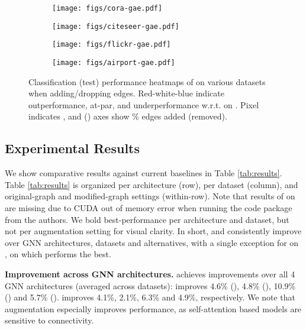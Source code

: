 \documentclass[letterpaper]{article} \usepackage{aaai21}  \usepackage{times}  \usepackage{helvet} \usepackage{courier}  \usepackage[hyphens]{url}  \usepackage{graphicx} \urlstyle{rm} \def\UrlFont{\rm}  \usepackage{natbib}  \usepackage{caption} \frenchspacing  \setlength{\pdfpagewidth}{8.5in}  \setlength{\pdfpageheight}{11in}
\begin{document}
\begin{figure}[t]
    \centering
        \begin{subfigure}[b]{.35\linewidth}
          \texttt{[image: figs/cora-gae.pdf]}
            \caption{\cora}\label{fig:}
        \end{subfigure}
        \quad
        \begin{subfigure}[b]{.35\linewidth}
          \texttt{[image: figs/citeseer-gae.pdf]}
            \caption{\citeseer}\label{fig:}
        \end{subfigure}
        \quad
        \begin{subfigure}[b]{.35\linewidth}
            \texttt{[image: figs/flickr-gae.pdf]}
            \caption{\flickr}\label{fig:}
        \end{subfigure}
        \quad
        \begin{subfigure}[b]{.35\linewidth}
            \texttt{[image: figs/airport-gae.pdf]}
            \caption{\airusa}\label{fig:}
        \end{subfigure}
    \caption{Classification (test) performance heatmaps of \methodtwo on various datasets when adding/dropping edges. Red-white-blue indicate outperformance, at-par, and underperformance w.r.t. \gcn on . Pixel  indicates , and  () axes show \% edges added (removed). }\label{fig:heat}
\end{figure}

\subsection{Experimental Results}

We show comparative results against current baselines in Table \ref{tab:results}.  Table \ref{tab:results} is organized per architecture (row), per dataset (column), and original-graph and modified-graph settings (within-row). Note that results of \bgcn on \ppi are missing due to CUDA out of memory error when running the code package from the authors. We bold best-performance per architecture and dataset, but not per augmentation setting for visual clarity.  In short, \method and \methodtwo consistently improve over GNN architectures, datasets and alternatives, with a single exception for \gat on \ppi, on which \dropedge performs the best.  








\noindent \textbf{Improvement across GNN architectures.} \methodshared achieves improvements over all 4 GNN architectures (averaged across datasets): \methodtwo improves 4.6\% (\gcn),  4.8\% (\gsage), 10.9\% (\gat) and 5.7\% (\jknet). \method improves 4.1\%, 2.1\%, 6.3\% and 4.9\%, respectively.  We note that augmentation especially improves \gat performance, as self-attention based models are sensitive to connectivity.
\end{document}
